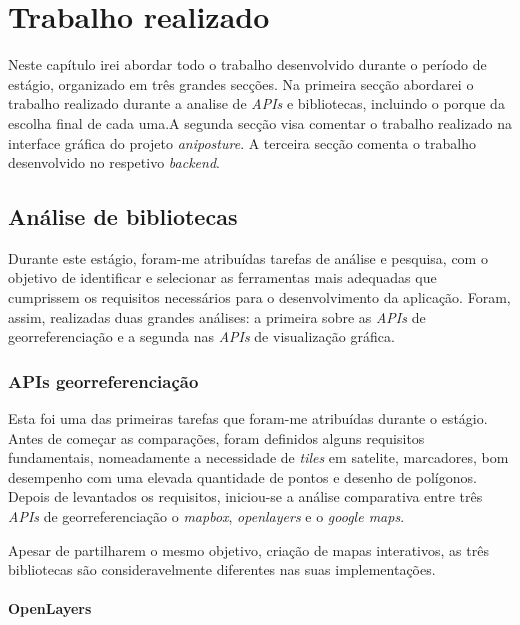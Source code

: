 \chapter{Trabalho realizado}
\label{chapter:work-done}

\begin{introduction}
    Neste capítulo irei abordar todo o trabalho desenvolvido durante o período de estágio, organizado em três grandes secções. Na primeira secção abordarei o trabalho realizado durante a analise de \textit{APIs} e bibliotecas, incluindo o porque da escolha final de cada uma.A segunda secção visa comentar o trabalho realizado na interface gráfica do projeto \textit{aniposture}. A terceira secção comenta o trabalho desenvolvido no respetivo \textit{backend}.
\end{introduction}

\section{Análise de bibliotecas}\label{sec:analysis}
Durante este estágio, foram-me atribuídas tarefas de análise e pesquisa, com o objetivo de identificar e selecionar as ferramentas mais adequadas que cumprissem os requisitos necessários para o desenvolvimento da aplicação. Foram, assim, realizadas duas grandes análises: a primeira sobre as \textit{APIs} de georreferenciação e a segunda nas \textit{APIs} de visualização gráfica.

\subsection{APIs georreferenciação}
Esta foi uma das primeiras tarefas que foram-me atribuídas durante o estágio. Antes de começar as comparações, foram definidos alguns requisitos fundamentais, nomeadamente a necessidade de \textit{tiles} em satelite, marcadores, bom desempenho com uma elevada quantidade de pontos e desenho de polígonos. Depois de levantados os requisitos, iniciou-se a análise comparativa entre três \textit{APIs} de georreferenciação o \textit{mapbox}, \textit{openlayers} e o \textit{google maps}.

Apesar de partilharem o mesmo objetivo, criação de mapas interativos, as três bibliotecas são consideravelmente diferentes nas suas implementações. 

\subsubsection{\textbf{OpenLayers}}\label{sec:sub_ol}

